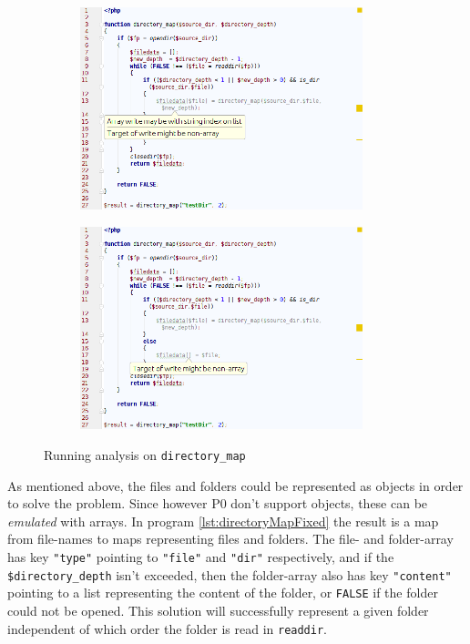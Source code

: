 \begin{figure}
\centering
\begin{subfigure}{\textwidth}
\centering
\includegraphics[width=0.9\textwidth]{chapters/caseStudy/screens/dir1}
\label{fig:directoryScreenshot1}

\end{subfigure}
\begin{subfigure}{\textwidth}
\centering
\includegraphics[width=0.9\textwidth]{chapters/caseStudy/screens/dir2}
\label{fig:directoryScreenshot2}

\end{subfigure}
\caption{Running analysis on \texttt{directory\_map}}
\label{fig:directoryScreenshot}
\end{figure}

As mentioned above, the files and folders could be represented as objects in order to solve the problem. Since however P0 don't support objects, these can be \textit{emulated} with arrays. In program \ref{lst:directoryMapFixed} the result is a map from file-names to maps representing files and folders. The file- and folder-array has key \texttt{"type"} pointing to \texttt{"file"} and \texttt{"dir"} respectively, and if the \texttt{\$directory\_depth} isn't exceeded, then the folder-array also has key \texttt{"content"} pointing to a list representing the content of the folder, or \texttt{FALSE} if the folder could not be opened.  This solution will successfully represent a given folder independent of which order the folder is read in \texttt{readdir}.


